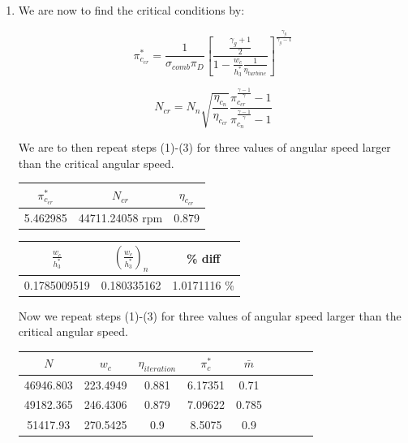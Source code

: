 \documentclass[titlepage]{article}
\begin{document}
\begin{enumerate}
  \item We are now to find the critical conditions by:
  
  \begin{equation}
    \pi_{c_{cr}}^{*} = \frac{1}{\sigma_{comb} \pi_{D}} \left[ \frac{\frac{\gamma_{g}+1}{2}}{1 - \frac{w_{c}}{h_{3}^{*}} \frac{1}{\eta_{turbine}}} \right]^{\frac{\gamma_{g}}{\gamma_{g}-1}}
  \end{equation}

  \begin{equation}
    N_{cr} = N_{n} \sqrt{\frac{\eta_{c_{n}}}{\eta_{c_{cr}}}} \frac{\pi_{c_{cr}}^{\frac{\gamma - 1}{\gamma}} -1}{\pi_{c_{n}}^{\frac{\gamma -1}{\gamma}} - 1}
  \end{equation}

  We are to then repeat steps (1)-(3) for three values of angular speed
  larger than the critical angular speed.

  \begin{center}
    \begin{tabular}{|c|c|c|}
      \hline
      $\pi_{c_{cr}}^{*}$ & $N_{cr}$ & $\eta_{c_{cr}}$ \\
      \hline
      5.462985 & 44711.24058 rpm & 0.879 \\
      \hline
    \end{tabular}
  \end{center}

  \begin{center}
    \begin{tabular}{|c|c|c|}
      \hline
      $\frac{w_{c}}{h_{3}^{*}}$ & $\left(\frac{w_{c}}{h_{3}^{*}}\right)_{n}$ & \% diff \\
      \hline
      0.1785009519 & 0.180335162 & 1.0171116 \% \\
      \hline
    \end{tabular}
  \end{center}

  Now we repeat steps (1)-(3) for three values of angular speed larger than the critical angular speed.

  \begin{center}
    \begin{tabular}{|c|c|c|c|c|c|c|c|c|}
      \hline
      $N$ & $w_{c}$ & $\eta_{iteration}$ & $\pi_{c}^{*}$ & $\bar{m}$ \\
      \hline
      46946.803 & 223.4949 & 0.881 & 6.17351 & 0.71 \\
      \hline
      49182.365 & 246.4306 & 0.879 & 7.09622 & 0.785 \\
      \hline
      51417.93	& 270.5425 & 0.9	& 8.5075	& 0.9 \\
      \hline
    \end{tabular}
  \end{center}


\end{enumerate}
\end{document}
